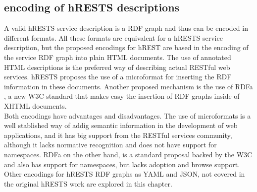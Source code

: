 \subsection{encoding of hRESTS descriptions}
A valid hRESTS service description is a RDF graph and thus can be encoded in different formats. All these formats are equivalent for a hRESTS service description, but the proposed encodings for hREST are based in the encoding of the service RDF graph into plain HTML documents. The use of annotated HTML descriptions is the preferred way of describing actual RESTful web services. hRESTS proposes the use of a microformat for inserting the RDF information in these documents. Another proposed mechanism is the use of RDFa \cite{rdfa}, a new W3C standard that makes easy the insertion of RDF graphs inside of XHTML documents.\\
Both encodings have advantages and disadvantages. The use of microformats is a well stablished way of addig semantic information in the development of web applications, and it has big support from the RESTful services community, although it lacks normative recognition and does not have support for namespaces. RDFa on the other hand, is a standard proposal backed by the W3C and also has support for namespaces, but lacks adoption and browse support.\\
Other encodings for hRESTS RDF graphs as YAML and JSON, not covered in the original hRESTS work are explored in this chapter.

